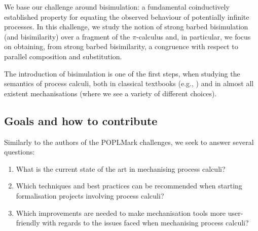 \documentclass[runningheads]{llncs}
\begin{document}
We base our challenge around
bisimulation: a fundamental coinductively established property for equating the
observed behaviour of potentially infinite processes. 
In this challenge, we study the notion of strong barbed bisimulation
(and bisimilarity)
over a fragment of the $\pi$-calculus and,
in particular, we focus on obtaining,
from strong barbed bisimilarity,
a congruence with respect to
parallel composition and substitution.

The introduction of bisimulation
is one of the first steps, when studying the
semantics of process calculi, both
in classical textbooks (e.g., \cite{})
and in almost all existent 
mechanisations \cite{}
(where we see a variety
of different choices).









\subsection{Goals and how to contribute}
Similarly to the authors of the POPLMark challenges, we seek to
answer several questions:
\begin{enumerate}[label=\textbf{(Q\arabic*)},leftmargin=10mm]
\item\label{item:rq1} What is the current state of the art in mechanising process calculi?
\item\label{item:rq2} Which techniques and best practices can be recommended when starting formalisation projects involving process calculi?
\item\label{item:rq3} Which improvements are needed to make mechanisation tools more user-friendly with regards to the issues faced when mechanising process calculi?
\end{enumerate}
\end{document}

